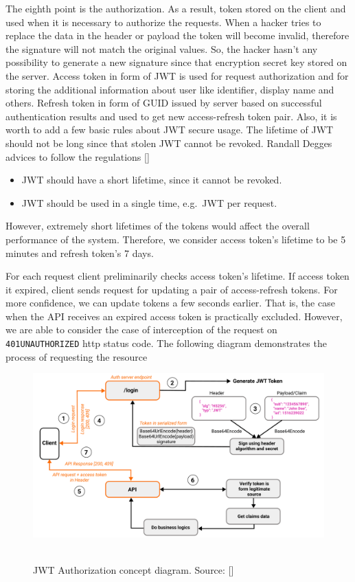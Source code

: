 The eighth point is the authorization.
As a result, token stored on the client and used when it is necessary to authorize the requests.
When a hacker tries to replace the data in the header or payload the token will become invalid,
therefore the signature will not match the original values.
So, the hacker hasn't any possibility to generate a new signature since that encryption secret key stored on the server.
Access token in form of JWT is used for request authorization and for storing the additional information
about user like identifier, display name and others.
Refresh token in form of GUID issued by server based on successful authentication results and used
to get new access-refresh token pair.
Also, it is worth to add a few basic rules about JWT secure usage.
The lifetime of JWT should not be long since that stolen JWT cannot be revoked.
Randall Degges advices to follow the regulations [\cite{RDegges}]
\begin{itemize}
    \item JWT should have a short lifetime, since it cannot be revoked.
    \item JWT should be used in a single time, e.g.\ JWT per request.
\end{itemize}
However, extremely short lifetimes of the tokens would affect the overall performance of the system.
Therefore, we consider access token's lifetime to be 5 minutes and refresh token's 7 days.

For each request client preliminarily checks access token's lifetime.
If access token it expired, client sends request for updating a pair of access-refresh tokens.
For more confidence, we can update tokens a few seconds earlier.
That is, the case when the API receives an expired access token is practically excluded.
However, we are able to consider the case of interception of the request on \texttt{401UNAUTHORIZED} http status code.
The following diagram demonstrates the process of requesting the resource

\begin{figure}[H]
    \centering
    \includegraphics[width=1\textwidth]{Pictures/06_JWT_authorization_concept_diagram}
    ~\caption{JWT Authorization concept diagram. Source: [\cite{mango2021figma}]}\label{fig:figure3}
\end{figure}

